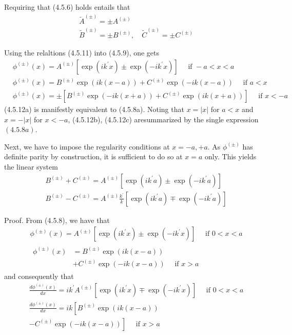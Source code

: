 \documentclass{article}
\begin{document}
Requiring that (4.5.6) holds entails that
$$
\begin{align*}
& \tilde{A}^{( \pm)}= \pm A^{( \pm)}  \tag{4.5.11a}\\
& \tilde{B}^{( \pm)}= \pm B^{( \pm)}, \quad \tilde{C}^{( \pm)}= \pm C^{( \pm)} \tag{4.5.11b}
\end{align*}
$$

Using the relaltions (4.5.11) into (4.5.9), one gets
$$
\begin{align*}
& \phi^{( \pm)}(x)=A^{( \pm)}\left[\exp \left(i k^{\prime} x\right) \pm \exp \left(-i k^{\prime} x\right)\right] \quad \text { if }-a<x<a  \tag{4.5.12a}\\
& \phi^{( \pm)}(x)=B^{( \pm)} \exp (i k(x-a))+C^{( \pm)} \exp (-i k(x-a)) \quad \text { if } a<x  \tag{4.5.12b}\\
& \phi^{( \pm)}(x)= \pm\left[B^{( \pm)} \exp (-i k(x+a))+C^{( \pm)} \exp (i k(x+a))\right] \quad \text { if } x<-a \tag{4.5.12c}
\end{align*}
$$
(4.5.12a) is manifestly equivalent to (4.5.8a). Noting that $x=|x|$ for $a<x$ and $x=-|x|$ for $x<-a$, (4.5.12b), (4.5.12c) aresummarized by the single expression $(4.5 .8 a)$.

Next, we have to impose the regularity conditions at $x=-a,+a$. As $\phi^{( \pm)}$ has definite parity by construction, it is sufficient to do so at $x=a$ only. This yields the linear system
$$
\begin{align*}
& B^{( \pm)}+C^{( \pm)}=A^{( \pm)}\left[\exp \left(i k^{\prime} a\right) \pm \exp \left(-i k^{\prime} a\right)\right]  \tag{4.5.13a}\\
& B^{( \pm)}-C^{( \pm)}=A^{( \pm)} \frac{k^{\prime}}{k}\left[\exp \left(i k^{\prime} a\right) \mp \exp \left(-i k^{\prime} a\right)\right] \tag{4.5.13b}
\end{align*}
$$

Proof. From (4.5.8), we have that
$$
\begin{align*}
& \phi^{( \pm)}(x)=A^{( \pm)}\left[\exp \left(i k^{\prime} x\right) \pm \exp \left(-i k^{\prime} x\right)\right] \quad \text { if } 0<x<a  \tag{4.5.14a}\\
& \begin{align*}
\phi^{( \pm)}(x) & =B^{( \pm)} \exp (i k(x-a)) \\
& +C^{( \pm)} \exp (-i k(x-a)) \quad \text { if } x>a
\end{align*} \tag{4.5.14b}
\end{align*}
$$
and consequently that
$$
\begin{align*}
& \frac{d \phi^{( \pm)}(x)}{d x}=i k^{\prime} A^{( \pm)}\left[\exp \left(i k^{\prime} x\right) \mp \exp \left(-i k^{\prime} x\right)\right] \quad \text { if } 0<x<a  \tag{4.5.15a}\\
& \frac{d \phi^{( \pm)}(x)}{d x}=i k\left[B^{( \pm)} \exp (i k(x-a))\right.  \tag{4.5.15b}\\
& \left.-C^{( \pm)} \exp (-i k(x-a))\right] \quad \text { if } x>a
\end{align*}
$$
\end{document}
